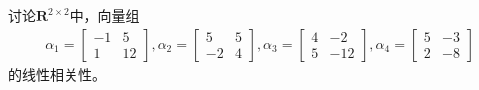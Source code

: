 \begin{example}
    讨论$\mathbf{R}^{2\times{2}}$中，向量组
    \begin{eqnarray}
        \alpha_{1}=\left[\begin{array}{cc}
            -1 & 5\\
            1& 12
        \end{array}\right],
        \alpha_{2}=\left[\begin{array}{cc}
            5 & 5\\
            -2& 4
        \end{array}\right],
        \alpha_{3}=\left[\begin{array}{cc}
            4 & -2\\
            5& -12
        \end{array}\right],
        \alpha_{4}=\left[\begin{array}{cc}
            5 & -3\\
            2& -8
        \end{array}\right]\nonumber
    \end{eqnarray}
    的线性相关性。
\end{example}

